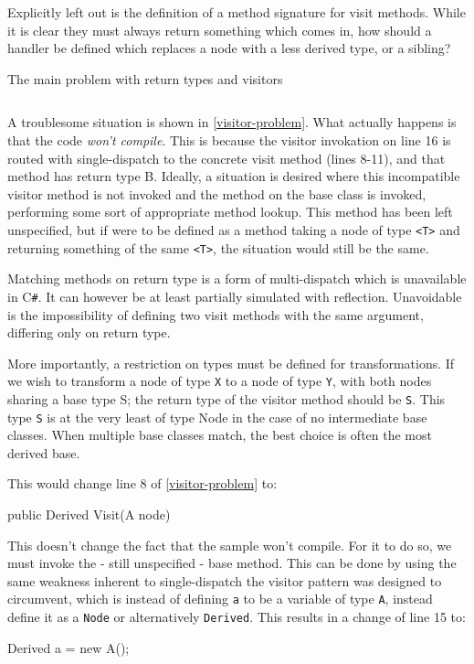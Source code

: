 \documentclass[twoside,openright]{uva-bachelor-thesis}
\newcommand{\code}[1]{\texttt{\footnotesize#1}}
\newcommand{\cs}{C\texttt{\#}\xspace}
\begin{document}
			Explicitly left out is the definition of a method signature for visit methods. While it is clear they must always return something which comes in, how should a handler be defined which replaces a node with a less derived type, or a sibling?
			\begin{codebox}[label=visitor-problem]{The main problem with return types and visitors}
				\inputminted[frame=leftline,linenos]{csharp}{samples/visitor_issue.cs}
			\end{codebox}
			
			A troublesome situation is shown in \cref{visitor-problem}. What actually happens is that the code \emph{won't compile}. This is because the visitor invokation on line 16 is routed with single-dispatch to the concrete visit method (lines 8-11), and that method has return type B. Ideally, a situation is desired where this incompatible visitor method is not invoked and the method on the base class is invoked, performing some sort of appropriate method lookup. This method has been left unspecified, but if were to be defined as a method taking a node of type \code{<T>} and returning something of the same \code{<T>}, the situation would still be the same.
			
			Matching methods on return type is a form of multi-dispatch which is unavailable in \cs. It can however be at least partially simulated with reflection. Unavoidable is the impossibility of defining two visit methods with the same argument, differing only on return type.
			
			More importantly, a restriction on types must be defined for transformations. If we wish to transform a node of type \code{X} to a node of type \code{Y}, with both nodes sharing a base type {S}; the return type of the visitor method should be \code{S}. This type \code{S} is at the very least of type Node in the case of no intermediate base classes. When multiple base classes match, the best choice is often the most derived base.
			
			This would change line 8 of \cref{visitor-problem} to:
			\begin{codespan}
				\begin{csharpcode}
					public Derived Visit(A node)
				\end{csharpcode}
			\end{codespan}
						
			This doesn't change the fact that the sample won't compile. For it to do so, we must invoke the - still unspecified - base method. This can be done by using the same weakness inherent to single-dispatch the visitor pattern was designed to circumvent, which is instead of defining \code{a} to be a variable of type \code{A}, instead define it as a \code{Node} or alternatively \code{Derived}. This results in a change of line 15 to:
			\begin{codespan}
				\begin{csharpcode}
					Derived a = new A();
				\end{csharpcode}
			\end{codespan}
			
\end{document}
